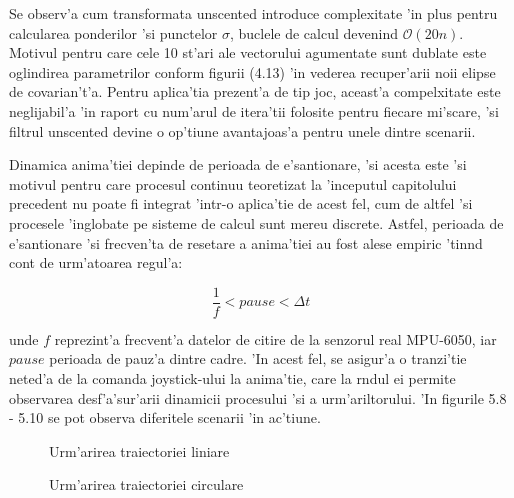 \documentclass[12pt,a4paper,twoside]{report}
\begin{document}
\vspace{5px}

Se observ'a  cum transformata unscented introduce complexitate 'in plus pentru calcularea ponderilor 'si punctelor $\sigma$, buclele de calcul devenind $\mathcal{O}(20n)$. Motivul pentru care cele 10 st'ari ale vectorului agumentate sunt dublate este oglindirea parametrilor conform figurii (4.13) 'in vederea recuper'arii noii elipse de covarian't'a. Pentru aplica'tia prezent'a de tip joc, aceast'a compelxitate este neglijabil'a 'in raport cu num'arul de itera'tii folosite pentru fiecare mi'scare, 'si filtrul unscented devine o op'tiune avantajoas'a pentru unele dintre scenarii. 

\vspace{5px}

Dinamica anima'tiei depinde de perioada de e'santionare, 'si acesta este 'si motivul pentru care procesul continuu teoretizat la 'inceputul capitolului precedent nu poate fi integrat 'intr-o aplica'tie de acest fel, cum de altfel 'si procesele 'inglobate pe sisteme de calcul sunt mereu discrete. Astfel, perioada de e'santionare 'si frecven'ta de resetare a anima'tiei au fost alese empiric 'tin\ia nd cont de urm'atoarea regul'a:

\begin{equation}
    \frac{1}{f} < pause < \Delta t 
\end{equation}

unde $f$ reprezint'a frecvent'a datelor de citire de la senzorul real MPU-6050, iar $pause$ perioada de pauz'a dintre cadre. 'In acest fel, se asigur'a o tranzi'tie neted'a de la comanda joystick-ului la anima'tie, care la r\ia ndul ei permite observarea desf'a'sur'arii dinamicii procesului 'si a urm'ariltorului. 'In figurile 5.8 - 5.10 se pot observa diferitele scenarii 'in ac'tiune.

\begin{figure}[h]
    \hspace*{-3cm}
    \qquad
    \caption{Urm'arirea traiectoriei liniare}%
\end{figure}


\begin{figure}[h]
    \hspace*{-3cm}
    \qquad
    \caption{Urm'arirea traiectoriei circulare}%
\end{figure}
\end{document}
